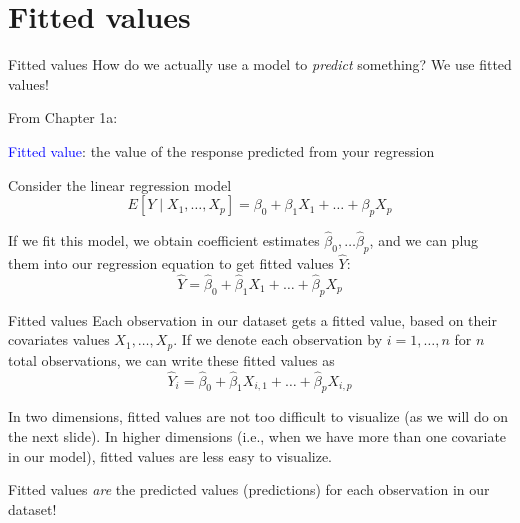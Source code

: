\documentclass[10pt,t]{beamer}
\begin{document}
\section{Fitted values}

\begin{frame}{Fitted values}
How do we actually use a model to \textit{predict} something? We use fitted values!

\vspace{0.3cm}

From Chapter 1a:

\vspace{0.3cm}

\textcolor{blue}{Fitted value}: the value of the response predicted from your regression \pause

\vspace{0.3cm}

Consider the linear regression model
$$
E[Y \mid X_1, \dots, X_p] = \beta_0 + \beta_1 X_1 + \dots + \beta_p X_p
$$

If we fit this model, we obtain coefficient estimates $\hat{\beta}_0, \dots \hat{\beta}_p$, and we can plug them into our regression equation to get fitted values $\hat{Y}$:
$$
\hat{Y} = \hat{\beta}_0 + \hat{\beta}_1 X_1 + \dots + \hat{\beta}_p X_p
$$

\end{frame}

\begin{frame}{Fitted values}
Each observation in our dataset gets a fitted value, based on their covariates values $X_1, \dots, X_p$. If we denote each observation by $i = 1, \dots, n$ for $n$ total observations, we can write these fitted values as
$$
\hat{Y}_i = \hat{\beta}_0 + \hat{\beta}_1 X_{i, 1} + \dots + \hat{\beta}_p X_{i, p}
$$

In two dimensions, fitted values are not too difficult to visualize (as we will do on the next slide). In higher dimensions (i.e., when we have more than one covariate in our model), fitted values are less easy to visualize.

\vspace{0.3cm}

Fitted values \textit{are} the predicted values (predictions) for each observation in our dataset!

\end{frame}
\end{document}
